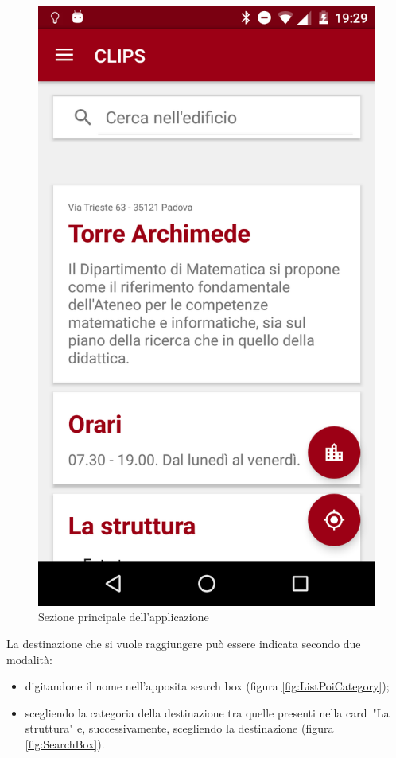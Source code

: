 \documentclass[../Sperimentazione.tex]{subfiles}
\begin{document}
			\begin{figure} [h]
				\centering
				\includegraphics[scale=0.2]{img/home_cards}
				\caption{Sezione principale dell'applicazione}
				\label{fig:HomeCards}
			\end{figure}

	
		La destinazione che si vuole raggiungere può essere indicata secondo due modalità:
		\begin{itemize}
			\item digitandone il nome nell'apposita search box (figura \ref{fig:ListPoiCategory});
			\item scegliendo la categoria della destinazione tra quelle presenti nella card\g\ "La struttura" e, successivamente, scegliendo la destinazione (figura \ref{fig:SearchBox}).
		\end{itemize}
		
\end{document}
